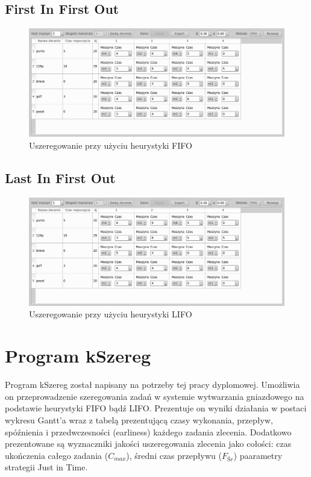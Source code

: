 \documentclass[twoside]{kInzynierka}
\begin{document}
\subsection{First In First Out}

\begin{figure}[htb]
    \centering
    \includegraphics[width=\textwidth, keepaspectratio=true]{./obrazki/main}
    \caption{Uszeregowanie przy użyciu heurystyki FIFO}
\end{figure}

\subsection{Last In First Out}

\begin{figure}[htb]
    \centering
    \includegraphics[width=\textwidth, keepaspectratio=true]{./obrazki/main}
    \caption{Uszeregowanie przy użyciu heurystyki LIFO}
\end{figure}

       
\section        {Program kSzereg}
Program kSzereg został napisany na potrzeby tej pracy dyplomowej. Umożliwia on przeprowadzenie szeregowania zadań w systemie wytwarzania gniazdowego na podstawie heurystyki FIFO bądź LIFO. Prezentuje on wyniki działania w postaci wykresu Gantt'a wraz z tabelą prezentującą czasy wykonania, przepływ, spóźnienia i przedwczesności (earliness) każdego zadania zlecenia. Dodatkowo prezentowane są wyznaczniki jakości uszeregowania zlecenia jako cołości: czas ukończenia całego zadania (\(C_{max}\)), średni czas przepływu (\(F_{Śr}\)) paarametry strategii Just in Time.
\end{document}
